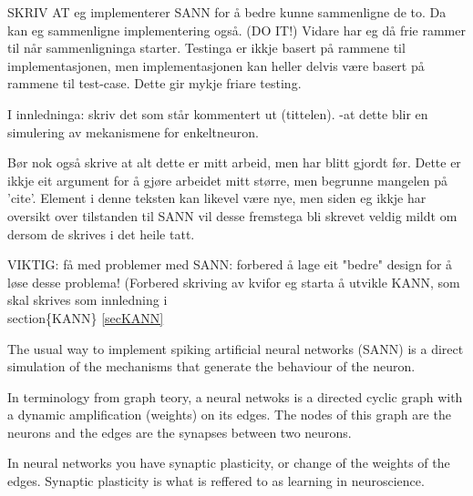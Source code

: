 	SKRIV AT eg implementerer SANN for å bedre kunne sammenligne de to. Da kan eg sammenligne implementering også. (DO IT!)
	Vidare har eg då frie rammer til når sammenligninga starter. Testinga er ikkje basert på rammene til implementasjonen, men implementasjonen kan heller delvis være basert på rammene til test-case. Dette gir mykje friare testing.

	I innledninga: skriv det som står kommentert ut (tittelen). -at dette blir en simulering av mekanismene for enkeltneuron.

	Bør nok også skrive at alt dette er mitt arbeid, men har blitt gjordt før.
	Dette er ikkje eit argument for å gjøre arbeidet mitt større, men begrunne mangelen på 'cite'.
	Element i denne teksten kan likevel være nye, men siden eg ikkje har oversikt over tilstanden til SANN vil desse fremstega bli skrevet veldig mildt om dersom de skrives i det heile tatt.

	VIKTIG: få med problemer med SANN: forbered å lage eit "bedre" design for å løse desse problema! (Forbered skriving av kvifor eg starta å utvikle KANN, som skal skrives som innledning i \\section\{KANN\} \ref{secKANN}


	The usual way to implement spiking artificial neural networks (SANN) is a direct simulation of the mechanisms that generate the behaviour of the neuron.
	
	In terminology from graph teory, a neural netwoks is a directed cyclic graph with a dynamic amplification (weights) on its edges.
	The nodes of this graph are the neurons and the edges are the synapses between two neurons.%

	In neural networks you have synaptic plasticity, or change of the weights of the edges. Synaptic plasticity is what is reffered to as learning in neuroscience. %



